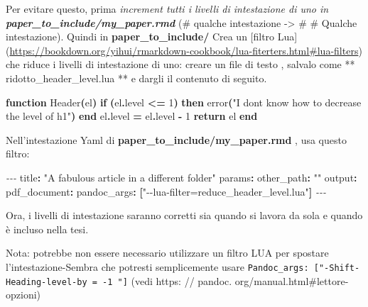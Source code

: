 \documentclass[a4paper, 11pt, nobind]{templates/ociamthesis}
\newenvironment{Shaded}{\begin{snugshade}}{\end{snugshade}}
\newcommand{\AttributeTok}[1]{\textcolor[rgb]{0.77,0.63,0.00}{#1}}
\newcommand{\ControlFlowTok}[1]{\textcolor[rgb]{0.13,0.29,0.53}{\textbf{#1}}}
\newcommand{\DecValTok}[1]{\textcolor[rgb]{0.00,0.00,0.81}{#1}}
\newcommand{\FunctionTok}[1]{\textcolor[rgb]{0.00,0.00,0.00}{#1}}
\newcommand{\KeywordTok}[1]{\textcolor[rgb]{0.13,0.29,0.53}{\textbf{#1}}}
\newcommand{\NormalTok}[1]{#1}
\newcommand{\OperatorTok}[1]{\textcolor[rgb]{0.81,0.36,0.00}{\textbf{#1}}}
\newcommand{\PreprocessorTok}[1]{\textcolor[rgb]{0.56,0.35,0.01}{\textit{#1}}}
\newcommand{\StringTok}[1]{\textcolor[rgb]{0.31,0.60,0.02}{#1}}
\renewenvironment{Shaded}
{
  \vspace{10pt}%
  \begin{snugshade}%
}{%
  \end{snugshade}%
  \vspace{8pt}%
}
\begin{document}
Per evitare questo, prima \emph{increment tutti i livelli di intestazione di uno in \textbf{paper\_to\_include/my\_paper.rmd } } (\# qualche intestazione -\textgreater{} \# \# Qualche intestazione).
Quindi in \textbf{paper\_to\_include/} Crea un {[}filtro Lua{]} (\url{https://bookdown.org/yihui/rmarkdown-cookbook/lua-fiterters.html\#lua-filters}) che riduce i livelli di intestazione di uno: creare un file di testo , salvalo come ** ridotto\_header\_level.lua ** e dargli il contenuto di seguito.

\begin{Shaded}
\begin{Highlighting}[]
\KeywordTok{function}\NormalTok{ Header}\OperatorTok{(}\NormalTok{el}\OperatorTok{)}
  \ControlFlowTok{if} \OperatorTok{(}\NormalTok{el}\OperatorTok{.}\NormalTok{level }\OperatorTok{\textless{}=} \DecValTok{1}\OperatorTok{)} \ControlFlowTok{then}
    \FunctionTok{error}\OperatorTok{(}\StringTok{"I don\textquotesingle{}t know how to decrease the level of h1"}\OperatorTok{)}
  \ControlFlowTok{end}
\NormalTok{  el}\OperatorTok{.}\NormalTok{level }\OperatorTok{=}\NormalTok{ el}\OperatorTok{.}\NormalTok{level }\OperatorTok{{-}} \DecValTok{1}
  \ControlFlowTok{return}\NormalTok{ el}
\KeywordTok{end}
\end{Highlighting}
\end{Shaded}

Nell'intestazione Yaml di \textbf{paper\_to\_include/my\_paper.rmd }, usa questo filtro:

\begin{Shaded}
\begin{Highlighting}[]
\PreprocessorTok{{-}{-}{-}}
\FunctionTok{title}\KeywordTok{:}\AttributeTok{ }\StringTok{"A fabulous article in a different folder"}
\FunctionTok{params}\KeywordTok{:}
\AttributeTok{  }\FunctionTok{other\_path}\KeywordTok{:}\AttributeTok{ }\StringTok{""}
\FunctionTok{output}\KeywordTok{:}
\AttributeTok{  }\FunctionTok{pdf\_document}\KeywordTok{:}\AttributeTok{ }
\AttributeTok{    }\FunctionTok{pandoc\_args}\KeywordTok{:}\AttributeTok{ }\KeywordTok{[}\StringTok{"{-}{-}lua{-}filter=reduce\_header\_level.lua"}\KeywordTok{]}
\PreprocessorTok{{-}{-}{-}}
\end{Highlighting}
\end{Shaded}

Ora, i livelli di intestazione saranno corretti sia quando si lavora da sola e quando è incluso nella tesi.

Nota: potrebbe non essere necessario utilizzare un filtro LUA per spostare l'intestazione-Sembra che potresti semplicemente usare \texttt{Pandoc\_args:\ {[}"-Shift-Heading-level-by\ =\ -1\ "{]}} (vedi https: // pandoc. org/manual.html\#lettore-opzioni)
\end{document}
